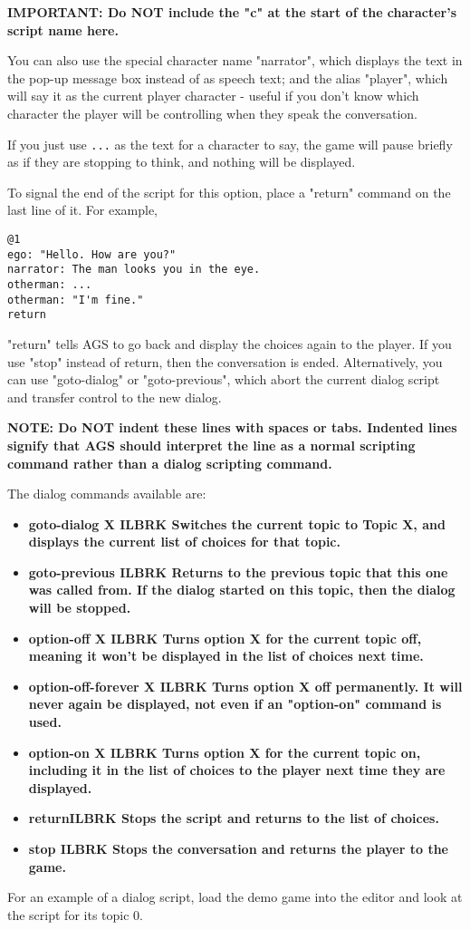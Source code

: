 \bf{IMPORTANT:} Do \bf{NOT} include the "c" at the start of the character's
script name here.

You can also use the special character name "narrator", which
displays the text in the pop-up message box instead of as speech text; and the
alias "player", which will say it as the current player character - useful if
you don't know which character the player will be controlling when they speak
the conversation.

If you just use \verb$...$ as the text for a character to say, the game will
pause briefly as if they are stopping to think, and nothing will be displayed.

To signal the end of the script for this option, place a "return" command on
the last line of it. For example,
\begin{verbatim}
@1
ego: "Hello. How are you?"
narrator: The man looks you in the eye.
otherman: ...
otherman: "I'm fine."
return
\end{verbatim}
"return" tells AGS to go back and display the choices again to the player.
If you use "stop" instead of return, then the conversation is ended. Alternatively,
you can use "goto-dialog" or "goto-previous", which abort the current dialog script
and transfer control to the new dialog.

\bf{NOTE:} Do \bf{NOT} indent these lines with spaces or tabs. Indented lines
signify that AGS should interpret the line as a normal scripting command
rather than a dialog scripting command.

The dialog commands available are:
\begin{itemize}\itemsep=10pt
\item \bf{goto-dialog X} ILBRK
  Switches the current topic to Topic X, and displays the current list of
  choices for that topic.
\item \bf{goto-previous} ILBRK
  Returns to the previous topic that this one was called from. If the dialog
  started on this topic, then the dialog will be stopped.
\item \bf{option-off X} ILBRK
  Turns option X for the current topic off, meaning it won't be displayed in
  the list of choices next time.
\item \bf{option-off-forever X} ILBRK
  Turns option X off permanently. It will never again be displayed, not even
  if an "option-on" command is used.
\item \bf{option-on X} ILBRK
  Turns option X for the current topic on, including it in the list of choices
  to the player next time they are displayed.
\item \bf{return}ILBRK
  Stops the script and returns to the list of choices.
\item \bf{stop} ILBRK
  Stops the conversation and returns the player to the game.
\end{itemize}
For an example of a dialog script, load the demo game into the editor and
look at the script for its topic 0.


